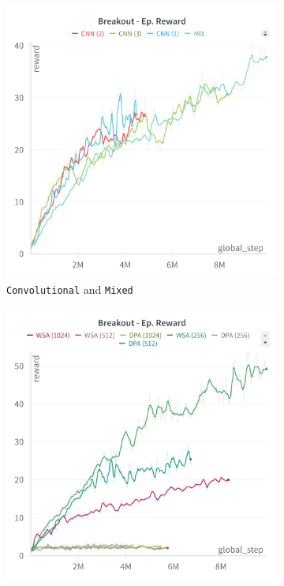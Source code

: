 \begin{figure}[ht]
\begin{subfigure}[b]{0.45\textwidth}
        \includegraphics[width=\textwidth]{images/breakout_cnn_mix.png}
        \caption{\texttt{Convolutional} and \texttt{Mixed}}
        \label{fig:breakout_cnn_mix}
    \end{subfigure}
    \hfill
    \begin{subfigure}[b]{0.45\textwidth}
        \centering
        \includegraphics[width=\textwidth]{images/breakout_wsa_dpa.png}

\end{subfigure}
\end{figure}
